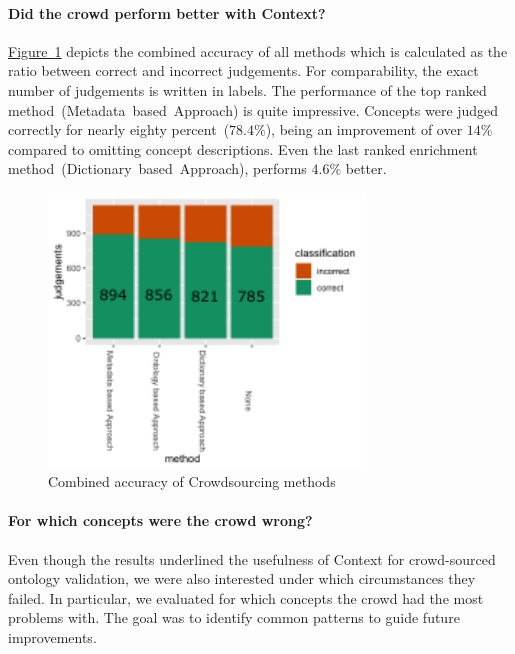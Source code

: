 \paragraph{Did the crowd perform better with Context?}
\hyperref[fig:results_accuracy_combined]{Figure~\ref*{fig:results_accuracy_combined}} depicts the combined accuracy of all methods which is calculated
as the ratio between correct and incorrect judgements. For comparability, the exact number of judgements is written in labels. The performance of the top ranked method~(Metadata~based~Approach) is quite impressive. Concepts were judged correctly for nearly eighty percent~($78.4\%$), being an improvement of over $14\%$ compared to omitting concept descriptions. Even the last ranked enrichment method~(Dictionary~based~Approach), performs $4.6\%$ better.
\begin{figure}
	 \centering
	 \includegraphics[width=0.75\textwidth]{plots/comparison/barplot_all_judgements_corrected}
	 \caption{Combined accuracy of Crowdsourcing methods}\label{fig:results_accuracy_combined}
\end{figure}

\paragraph{For which concepts were the crowd wrong?}
Even though the results underlined the usefulness of Context for crowd-sourced ontology validation, we were also interested under which circumstances they failed. In particular, we evaluated for which concepts the crowd had the most problems with. The goal was to identify common patterns to guide future improvements. 

